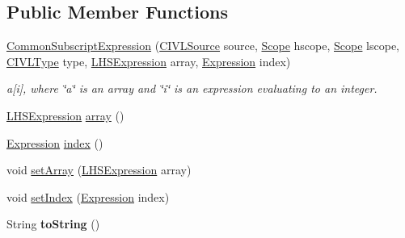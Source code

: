 \subsection*{Public Member Functions}
\begin{DoxyCompactItemize}
\item 
\hyperlink{classedu_1_1udel_1_1cis_1_1vsl_1_1civl_1_1model_1_1common_1_1expression_1_1CommonSubscriptExpression_af56e47c7dfc7a44d91ec18cbbaa30d3e}{Common\+Subscript\+Expression} (\hyperlink{interfaceedu_1_1udel_1_1cis_1_1vsl_1_1civl_1_1model_1_1IF_1_1CIVLSource}{C\+I\+V\+L\+Source} source, \hyperlink{interfaceedu_1_1udel_1_1cis_1_1vsl_1_1civl_1_1model_1_1IF_1_1Scope}{Scope} hscope, \hyperlink{interfaceedu_1_1udel_1_1cis_1_1vsl_1_1civl_1_1model_1_1IF_1_1Scope}{Scope} lscope, \hyperlink{interfaceedu_1_1udel_1_1cis_1_1vsl_1_1civl_1_1model_1_1IF_1_1type_1_1CIVLType}{C\+I\+V\+L\+Type} type, \hyperlink{interfaceedu_1_1udel_1_1cis_1_1vsl_1_1civl_1_1model_1_1IF_1_1expression_1_1LHSExpression}{L\+H\+S\+Expression} array, \hyperlink{interfaceedu_1_1udel_1_1cis_1_1vsl_1_1civl_1_1model_1_1IF_1_1expression_1_1Expression}{Expression} index)
\begin{DoxyCompactList}\small\item\em a\mbox{[}i\mbox{]}, where \char`\"{}a\char`\"{} is an array and \char`\"{}i\char`\"{} is an expression evaluating to an integer. \end{DoxyCompactList}\item 
\hyperlink{interfaceedu_1_1udel_1_1cis_1_1vsl_1_1civl_1_1model_1_1IF_1_1expression_1_1LHSExpression}{L\+H\+S\+Expression} \hyperlink{classedu_1_1udel_1_1cis_1_1vsl_1_1civl_1_1model_1_1common_1_1expression_1_1CommonSubscriptExpression_a72bb49b450f912c5cf7c05936e3e3413}{array} ()
\item 
\hyperlink{interfaceedu_1_1udel_1_1cis_1_1vsl_1_1civl_1_1model_1_1IF_1_1expression_1_1Expression}{Expression} \hyperlink{classedu_1_1udel_1_1cis_1_1vsl_1_1civl_1_1model_1_1common_1_1expression_1_1CommonSubscriptExpression_a7f32f84fd4aebb975cfc3da2327cd0e8}{index} ()
\item 
void \hyperlink{classedu_1_1udel_1_1cis_1_1vsl_1_1civl_1_1model_1_1common_1_1expression_1_1CommonSubscriptExpression_a1640005c0922fd2c5863a583cb233203}{set\+Array} (\hyperlink{interfaceedu_1_1udel_1_1cis_1_1vsl_1_1civl_1_1model_1_1IF_1_1expression_1_1LHSExpression}{L\+H\+S\+Expression} array)
\item 
void \hyperlink{classedu_1_1udel_1_1cis_1_1vsl_1_1civl_1_1model_1_1common_1_1expression_1_1CommonSubscriptExpression_a32bfcd78e1884fd28518e97ea8998216}{set\+Index} (\hyperlink{interfaceedu_1_1udel_1_1cis_1_1vsl_1_1civl_1_1model_1_1IF_1_1expression_1_1Expression}{Expression} index)
\item 
\hypertarget{classedu_1_1udel_1_1cis_1_1vsl_1_1civl_1_1model_1_1common_1_1expression_1_1CommonSubscriptExpression_aaca20a6738d765aaf2578d728e4c899e}{}String {\bfseries to\+String} ()\label{classedu_1_1udel_1_1cis_1_1vsl_1_1civl_1_1model_1_1common_1_1expression_1_1CommonSubscriptExpression_aaca20a6738d765aaf2578d728e4c899e}


\end{DoxyCompactItemize}

